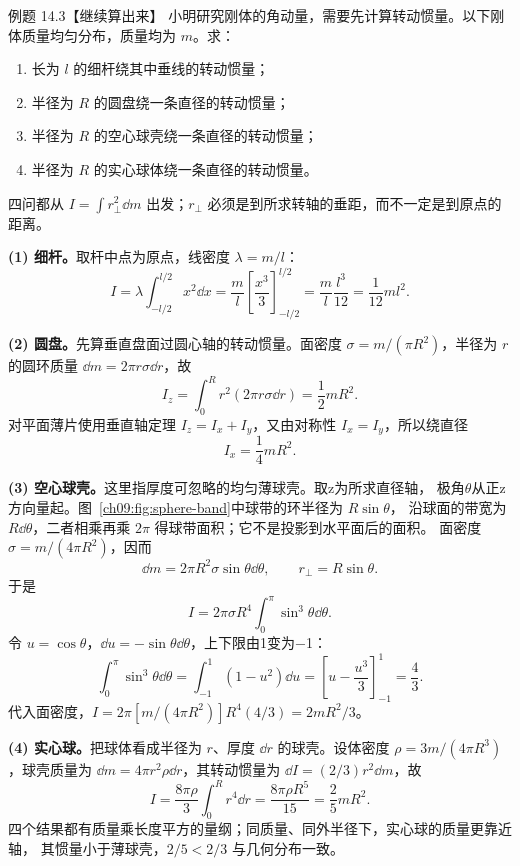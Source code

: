 \Needspace{0.35\textheight}
\begin{origexamplebox}{例题 14.3【继续算出来】}
小明研究刚体的角动量，需要先计算转动惯量。以下刚体质量均匀分布，质量均为 $m$。求：
\begin{enumerate}[label=(\arabic*),leftmargin=2.2em]
  \item 长为 $l$ 的细杆绕其中垂线的转动惯量；
  \item 半径为 $R$ 的圆盘绕一条直径的转动惯量；
  \item 半径为 $R$ 的空心球壳绕一条直径的转动惯量；
  \item 半径为 $R$ 的实心球体绕一条直径的转动惯量。
\end{enumerate}
\end{origexamplebox}

\begin{xesolution}
四问都从 $I=\int r_\perp^2\dd m$ 出发；$r_\perp$ 必须是到所求转轴的垂距，而不一定是到原点的距离。

\textbf{(1) 细杆。}\quad 取杆中点为原点，线密度 $\lambda=m/l$：
\[
 I=\lambda\int_{-l/2}^{l/2}x^2\dd x
 =\frac ml\left[\frac{x^3}{3}\right]_{-l/2}^{l/2}
 =\frac ml\frac{l^3}{12}=\boxed{\frac1{12}ml^2}.
\]

\textbf{(2) 圆盘。}\quad 先算垂直盘面过圆心轴的转动惯量。面密度
$\sigma=m/(\pi R^2)$，半径为 $r$ 的圆环质量 $\dd m=2\pi r\sigma\dd r$，故
\[
 I_z=\int_0^Rr^2(2\pi r\sigma\dd r)=\frac12mR^2.
\]
对平面薄片使用垂直轴定理 $I_z=I_x+I_y$，又由对称性 $I_x=I_y$，所以绕直径
\[
 \boxed{I_x=\frac14mR^2}.
\]

\textbf{(3) 空心球壳。}\quad 这里指厚度可忽略的均匀薄球壳。取z为所求直径轴，
极角$\theta$从正z方向量起。图~\ref{ch09:fig:sphere-band}中球带的环半径为 $R\sin\theta$，
沿球面的带宽为 $R\dd\theta$，二者相乘再乘 $2\pi$ 得球带面积；它不是投影到水平面后的面积。
\sphereBandDiagram
面密度 $\sigma=m/(4\pi R^2)$，因而
\[
 \dd m=2\pi R^2\sigma\sin\theta\dd\theta,
 \qquad r_\perp=R\sin\theta.
\]
于是
\[
 I=2\pi\sigma R^4\int_0^\pi\sin^3\theta\dd\theta.
\]
令 $u=\cos\theta$，$\dd u=-\sin\theta\dd\theta$，上下限由1变为−1：
\[
 \int_0^\pi\sin^3\theta\dd\theta
 =\int_{-1}^{1}(1-u^2)\dd u
 =\left[u-\frac{u^3}{3}\right]_{-1}^{1}=\frac43.
\]
代入面密度，$I=2\pi[m/(4\pi R^2)]R^4(4/3)=\boxed{2mR^2/3}$。

\textbf{(4) 实心球。}\quad 把球体看成半径为 $r$、厚度 $\dd r$ 的球壳。设体密度
$\rho=3m/(4\pi R^3)$，球壳质量为 $\dd m=4\pi r^2\rho\dd r$，其转动惯量为
$\dd I=(2/3)r^2\dd m$，故
\[
 I=\frac{8\pi\rho}{3}\int_0^Rr^4\dd r
 =\frac{8\pi\rho R^5}{15}
 =\boxed{\frac25mR^2}.
\]
四个结果都有质量乘长度平方的量纲；同质量、同外半径下，实心球的质量更靠近轴，
其惯量小于薄球壳，$2/5<2/3$ 与几何分布一致。
\end{xesolution}

